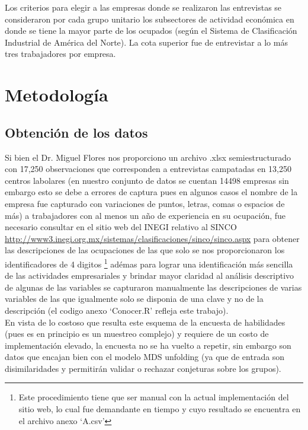 \documentclass[paper=letter, fontsize=11pt]{scrartcl}
\numberwithin{equation}{section} %
\numberwithin{figure}{section} %
\numberwithin{table}{section} %
\begin{document}
Los criterios para elegir a las empresas donde se realizaron las entrevistas se consideraron por cada grupo unitario los subsectores de actividad económica en donde se tiene la mayor parte de los ocupados (según el Sistema de Clasificación Industrial de América del Norte). La cota superior fue de entrevistar a lo más tres trabajadores por empresa.
\section{Metodología}
\subsection{Obtención de los datos}
Si bien el Dr. Miguel Flores nos proporciono un archivo .xlsx semiestructurado con 17,250 observaciones que corresponden a entrevistas campatadas en 13,250 centros labolares (en nuestro conjunto de datos se cuentan 14498 empresas sin embargo esto se debe a errores de captura pues en algunos casos el nombre de la empresa fue capturado con variaciones de puntos, letras, comas o espacios de más) a trabajadores con al menos un año de experiencia en su ocupación, fue necesario consultar en el sitio web del INEGI relativo al SINCO \url{http://www3.inegi.org.mx/sistemas/clasificaciones/sinco/sinco.aspx} para obtener las descripciones de las ocupaciones de las que solo se nos proporcionaron los identificadores de 4 digitos \footnote{ Este procedimiento tiene que ser manual con la actual implementación del sitio web, lo cual fue demandante en tiempo y cuyo resultado se encuentra en el archivo anexo ‘A.csv’ } adémas para lograr una identificación más sencilla de las actividades empresariales y brindar mayor claridad al análisis descriptivo de algunas de las variables se capturaron manualmente las descripciones de varias variables de las que igualmente solo se disponia de una clave y no de la descripción (el codigo anexo ‘Conocer.R’ refleja este trabajo).\\

En vista de lo costoso que resulta este esquema de la encuesta de habilidades (pues es en principio es un muestreo complejo) y requiere de un costo de implementación elevado, la encuesta no se ha vuelto a repetir, sin embargo son datos que encajan bien con el modelo MDS unfolding (ya que de entrada son disimilaridades y permitirán validar o rechazar conjeturas sobre los grupos).
\end{document}
